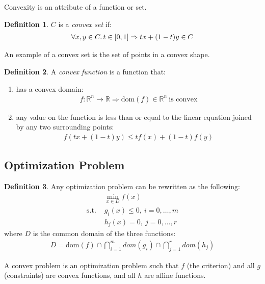 \documentclass[12pt]{article}
\newcommand{\RR}{\mathbb{R}}
\newcommand{\dom}{\text{dom}}
\newcommand{\st}{\text{s.t. }}
\theoremstyle{definition}
\newtheorem{defn}{Definition}[section]
\begin{document}
	Convexity is an attribute of a function or set.
	
	\begin{defn}
		$C$ is a \emph{convex set} if:
		\begin{gather*}
			\forall x, y \in C\ldotp t \in [0, 1] \Rightarrow tx + (1-t) y \in C
		\end{gather*}
	\end{defn}
	
	An example of a convex set is the set of points in a convex shape.
	
	\begin{defn}
		A \emph{convex function} is a function that:
		\begin{enumerate}
			\item has a convex domain:
			\begin{gather*}
				f: \RR^n \to \RR \Rightarrow \dom(f) \in \RR^n\ \text{is convex}
			\end{gather*}
			\item any value on the function is less than or equal to the linear equation joined by any two surrounding points:
			\begin{gather*}
				f(tx + (1 - t)y) \le tf(x) + (1 - t)f(y)
			\end{gather*}
		\end{enumerate}
	\end{defn}
	
	\subsection{Optimization Problem}
	
	\begin{defn}
		Any optimization problem can be rewritten as the following:
		\begin{align*}
			&\min_{x \in D} f(x) \\
			\st &g_i(x) \leq 0,\ i = 0, \dots, m \\
			& h_j(x) = 0,\ j = 0, \dots, r
		\end{align*}
		where $D$ is the common domain of the three functions:
		\begin{gather*}
			D = \dom(f) \cap \bigcap_{i=1}^m dom(g_i) \cap \bigcap_{j=1}^r dom(h_j)
		\end{gather*}
	\end{defn}
	
	A convex problem is an optimization problem such that $f$ (the criterion) and all $g$ (constraints) are convex functions, and all $h$ are affine functions.
	
\end{document}
